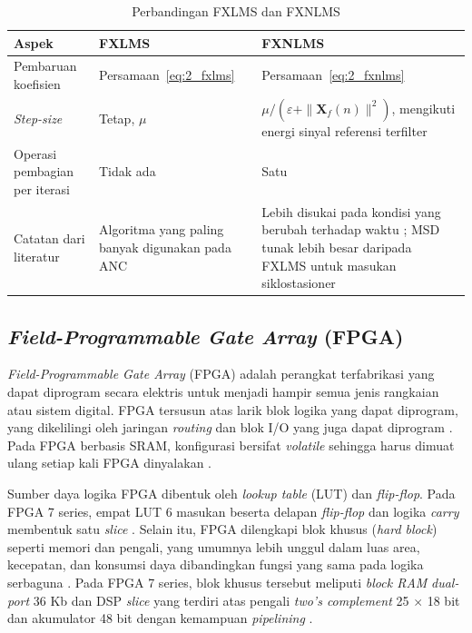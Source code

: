 \begin{table}[H]
  \centering
  \caption{Perbandingan FXLMS dan FXNLMS}
  \label{tab:fxlms_fxnlms}
  \renewcommand{\arraystretch}{1.4}
  \begin{tabular}{|>{\raggedright\arraybackslash}p{3.2cm}|>{\raggedright\arraybackslash}p{5.6cm}|>{\raggedright\arraybackslash}p{5.6cm}|}
  \hline
  \textbf{Aspek} & \textbf{FXLMS} & \textbf{FXNLMS} \\
  \hline
  Pembaruan koefisien & Persamaan~\eqref{eq:2_fxlms} \parencite{zhangrs2023} & Persamaan~\eqref{eq:2_fxnlms} \parencite{sarkar2025} \\
  \hline
  \emph{Step-size} & Tetap, $\mu$ & $\mu / (\varepsilon + \|\mathbf{X}_f(n)\|^2)$, mengikuti energi sinyal referensi terfilter \\
  \hline
  Operasi pembagian per iterasi & Tidak ada & Satu \parencite{li2026} \\
  \hline
  Catatan dari literatur & Algoritma yang paling banyak digunakan pada ANC \parencite{klemd2021} & Lebih disukai pada kondisi yang berubah terhadap waktu \parencite{sarkar2025}; MSD tunak lebih besar daripada FXLMS untuk masukan siklostasioner \parencite{pang2024} \\
  \hline
  \end{tabular}
\end{table}

\subsection{\emph{Field-Programmable Gate Array} (FPGA)}
\label{sec:fpga}

\emph{Field-Programmable Gate Array} (FPGA) adalah perangkat terfabrikasi yang dapat diprogram secara elektris untuk menjadi hampir semua jenis rangkaian atau sistem digital. FPGA tersusun atas larik blok logika yang dapat diprogram, yang dikelilingi oleh jaringan \emph{routing} dan blok I/O yang juga dapat diprogram \parencite{boutros2021}. Pada FPGA berbasis SRAM, konfigurasi bersifat \emph{volatile} sehingga harus dimuat ulang setiap kali FPGA dinyalakan \parencite{boutros2021,amd_ds180}.

Sumber daya logika FPGA dibentuk oleh \emph{lookup table} (LUT) dan \emph{flip-flop}. Pada FPGA 7 series, empat LUT 6 masukan beserta delapan \emph{flip-flop} dan logika \emph{carry} membentuk satu \emph{slice} \parencite{amd_ds180}. Selain itu, FPGA dilengkapi blok khusus (\emph{hard block}) seperti memori dan pengali, yang umumnya lebih unggul dalam luas area, kecepatan, dan konsumsi daya dibandingkan fungsi yang sama pada logika serbaguna \parencite{boutros2021}. Pada FPGA 7 series, blok khusus tersebut meliputi \emph{block RAM} \emph{dual-port} 36 Kb dan DSP \emph{slice} yang terdiri atas pengali \emph{two's complement} 25 $\times$ 18 bit dan akumulator 48 bit dengan kemampuan \emph{pipelining} \parencite{amd_ds180}.

